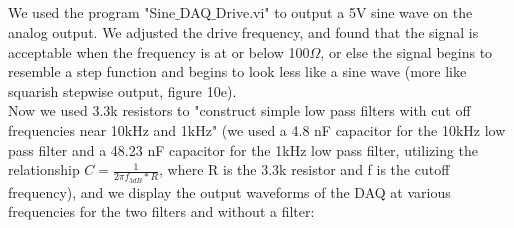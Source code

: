 \documentclass{article}
\begin{document}
\subsection{}
    We used the program "Sine$\_$DAQ$\_$Drive.vi" to output a 5V sine wave on the analog output. We adjusted the drive frequency, and found that the signal is acceptable when the frequency is at or below 100$\Omega$, or else the signal begins to resemble a step function and begins to look less like a sine wave (more like squarish stepwise output, figure 10e).\\\indent Now we used 3.3k resistors to "construct simple low pass filters with cut off frequencies near 10kHz and 1kHz" \cite{lab10} (we used a 4.8 nF capacitor for the 10kHz low pass filter and a 48.23 nF capacitor for the 1kHz low pass filter, utilizing the relationship $C=\frac{1}{2\pi f_{3dB}*R}$, where R is the 3.3k resistor and f is the cutoff frequency), and we display the output waveforms of the DAQ at various frequencies for the two filters and without a filter:
\end{document}
